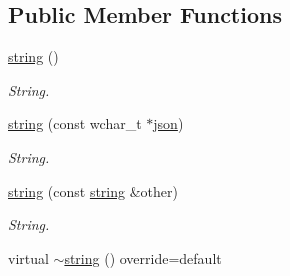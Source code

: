 \subsection*{Public Member Functions}
\begin{DoxyCompactItemize}
\item 
\hyperlink{classformat_1_1string_a39d80d4824791541f07d92e907c90c24}{string} ()\hypertarget{classformat_1_1string_a39d80d4824791541f07d92e907c90c24}{}\label{classformat_1_1string_a39d80d4824791541f07d92e907c90c24}

\begin{DoxyCompactList}\small\item\em String. \end{DoxyCompactList}\item 
\hyperlink{classformat_1_1string_a38c53c8153cd7dadc295329b32ba0ffd}{string} (const wchar\+\_\+t $\ast$\hyperlink{classformat_1_1json}{json})
\begin{DoxyCompactList}\small\item\em String. \end{DoxyCompactList}\item 
\hyperlink{classformat_1_1string_a46c207d7796b70808e571e14f1379df8}{string} (const \hyperlink{classformat_1_1string}{string} \&other)
\begin{DoxyCompactList}\small\item\em String. \end{DoxyCompactList}\item 
virtual \hyperlink{classformat_1_1string_af7dcae7eff45b579ffa8dd47d82326ca}{$\sim$string} () override=default\hypertarget{classformat_1_1string_af7dcae7eff45b579ffa8dd47d82326ca}{}\label{classformat_1_1string_af7dcae7eff45b579ffa8dd47d82326ca}


\end{DoxyCompactItemize}

